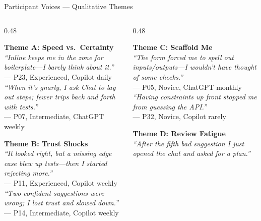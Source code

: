 \documentclass[10pt,aspectratio=169]{beamer}
\begin{document}
\begin{frame}{Participant Voices --- Qualitative Themes}
\vspace{-3pt}
\begin{columns}[T]
\begin{column}{0.48\textwidth}
\begin{quotebox}
\scriptsize
\textbf{Theme A: Speed vs.\ Certainty}\\[3pt]
\textit{``Inline keeps me in the zone for boilerplate---I barely think about it.''}\\
\hfill{\scriptsize --- P23, Experienced, Copilot daily}\\[4pt]
\textit{``When it's gnarly, I ask Chat to lay out steps; fewer trips back and forth with tests.''}\\
\hfill{\scriptsize --- P07, Intermediate, ChatGPT weekly}
\end{quotebox}
\vspace{-3pt}
\begin{quotebox}
\scriptsize
\textbf{Theme B: Trust Shocks}\\[3pt]
\textit{``It looked right, but a missing edge case blew up tests---then I started rejecting more.''}\\
\hfill{\scriptsize --- P11, Experienced, Copilot weekly}\\[4pt]
\textit{``Two confident suggestions were wrong; I lost trust and slowed down.''}\\
\hfill{\scriptsize --- P14, Intermediate, Copilot weekly}
\end{quotebox}
\end{column}
\begin{column}{0.48\textwidth}
\begin{quotebox}
\scriptsize
\textbf{Theme C: Scaffold Me}\\[3pt]
\textit{``The form forced me to spell out inputs/outputs---I wouldn't have thought of some checks.''}\\
\hfill{\scriptsize --- P05, Novice, ChatGPT monthly}\\[4pt]
\textit{``Having constraints up front stopped me from guessing the API.''}\\
\hfill{\scriptsize --- P32, Novice, Copilot rarely}
\end{quotebox}
\vspace{-3pt}
\begin{quotebox}
\scriptsize
\textbf{Theme D: Review Fatigue}\\[3pt]
\textit{``After the fifth bad suggestion I just opened the chat and asked for a plan.''}\\

\end{quotebox}
\end{column}
\end{columns}
\end{frame}
\end{document}
